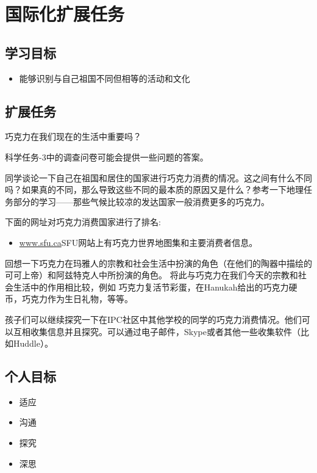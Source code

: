 \chapter{国际化扩展任务}

\section{学习目标}
  \begin{itemize}  
     \item 能够识别与自己祖国不同但相等的活动和文化 
  \end{itemize}



\section{扩展任务}
    巧克力在我们现在的生活中重要吗？\par
    科学任务-3中的调查问卷可能会提供一些问题的答案。\par
    同学谈论一下自己在祖国和居住的国家进行巧克力消费的情况。这之间有什么不同吗？如果真的不同，那么导致这些不同的最本质的原因又是什么？参考一下地理任务部分的学习——那些气候比较凉的发达国家一般消费更多的巧克力。\par
    下面的网址对巧克力消费国家进行了排名:\par
    \begin{itemize}
       \item \href{http://www.sfu.ca/geog351fall03/groups-webpages/gp8/consum/consum.html}{www.sfu.ca}SFU网站上有巧克力世界地图集和主要消费者信息。
    \end{itemize}  
    回想一下巧克力在玛雅人的宗教和社会生活中扮演的角色（在他们的陶器中描绘的可可上帝）和阿兹特克人中所扮演的角色。 将此与巧克力在我们今天的宗教和社会生活中的作用相比较，例如 巧克力复活节彩蛋，在Hanukah给出的巧克力硬币，巧克力作为生日礼物，等等。\par
    孩子们可以继续探究一下在IPC社区中其他学校的同学的巧克力消费情况。他们可以互相收集信息并且探究。可以通过电子邮件，Skype或者其他一些收集软件（比如Huddle）。\par



\section{个人目标}
\begin{itemize}
  \item 适应
  \item 沟通
  \item 探究
  \item 深思
\end{itemize}

